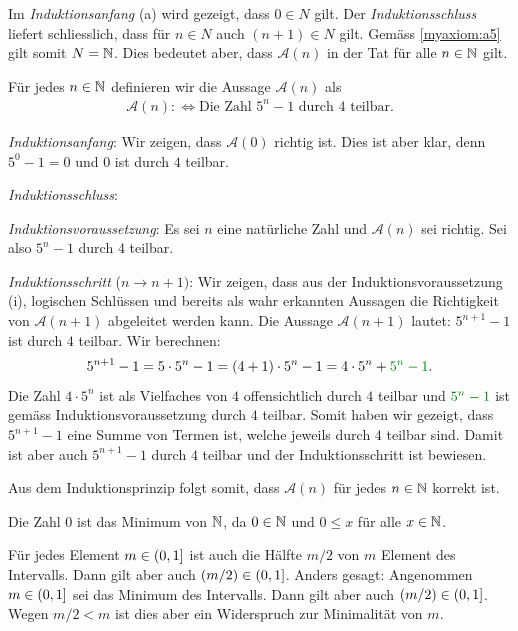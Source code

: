 \begin{myanswer}[myexercise:0201]
	Im \textit{Induktionsanfang} (a) wird gezeigt, dass $0\in N$ gilt. Der \textit{Induktionsschluss} liefert schliesslich, dass für $n\in N$ auch $(n+1)\in N$ gilt. Gemäss \cref{myaxiom:a5} gilt somit $N=\mathbb{N}$. Dies bedeutet aber, dass $\mathcal{A}(n)$ in der Tat für alle $n\in\mathbb{N}$ gilt.
\end{myanswer}
\clearpage
\begin{myanswer}[myexercise:0202]
	Für jedes $n\in\mathbb{N}$ definieren wir die Aussage $\mathcal{A}(n)$ als
	\begin{align*}
		\mathcal{A}(n) :\iff \text{Die Zahl $5^n-1$ durch $4$ teilbar}.
	\end{align*}
	\begin{aenum}
		\item \textit{Induktionsanfang}: Wir zeigen, dass $\mathcal{A}(0)$ richtig ist. Dies ist aber klar, denn $5^0-1=0$ und $0$ ist durch $4$ teilbar.
		\item \textit{Induktionsschluss}:
		\begin{renum}
			\item \textit{Induktionsvoraussetzung}: Es sei $n$ eine natürliche Zahl und $\mathcal{A}(n)$ sei richtig. Sei also $5^n-1$ durch $4$ teilbar.
			\item \textit{Induktionsschritt} ($n\to n+1)$: Wir zeigen, dass aus der Induktionsvoraussetzung (i), logischen Schlüssen und bereits als wahr erkannten Aussagen die Richtigkeit von $\mathcal{A}(n+1)$ abgeleitet werden kann. Die Aussage $\mathcal{A}(n+1)$ lautet: $5^{n+1}-1$ ist durch $4$ teilbar. Wir berechnen:
				\begin{align*}
					5^{n+1}-1 = 5\cdot 5^{n}-1 = (4+1)\cdot 5^n - 1 = 4\cdot 5^n + \textcolor{Green}{5^n -1}.
				\end{align*}
				Die Zahl $4\cdot 5^n$ ist als Vielfaches von $4$ offensichtlich durch $4$ teilbar und $\textcolor{Green}{5^n -1}$ ist gemäss Induktionsvoraussetzung durch $4$ teilbar. Somit haben wir gezeigt, dass $5^{n+1}-1$ eine Summe von Termen ist, welche jeweils durch $4$ teilbar sind. Damit ist aber auch $5^{n+1}-1$ durch $4$ teilbar und der Induktionsschritt ist bewiesen.
		\end{renum}
	\end{aenum}
	Aus dem Induktionsprinzip folgt somit, dass $\mathcal{A}(n)$ für jedes $n\in\mathbb{N}$ korrekt ist.
\end{myanswer}

\begin{myanswer}[myexercise:0267]
	\begin{aenum}
		\item Die Zahl $0$ ist das Minimum von $\mathbb{N}$, da $0\in\mathbb{N}$ und $0\leq x$ für alle $x\in\mathbb{N}$.
		\item Für jedes Element $m\in\left(0, 1\right]$ ist auch die Hälfte $m/2$ von $m$ Element des Intervalls. Dann gilt aber auch $\left(m/2\right)\in\left(0, 1\right]$. Anders gesagt: Angenommen $m\in\left(0, 1\right]$ sei das Minimum des Intervalls. Dann gilt aber auch $\left(m/2\right)\in\left(0, 1\right]$. Wegen $m/2<m$ ist dies aber ein Widerspruch zur Minimalität von $m$.
	\end{aenum}
\end{myanswer}

